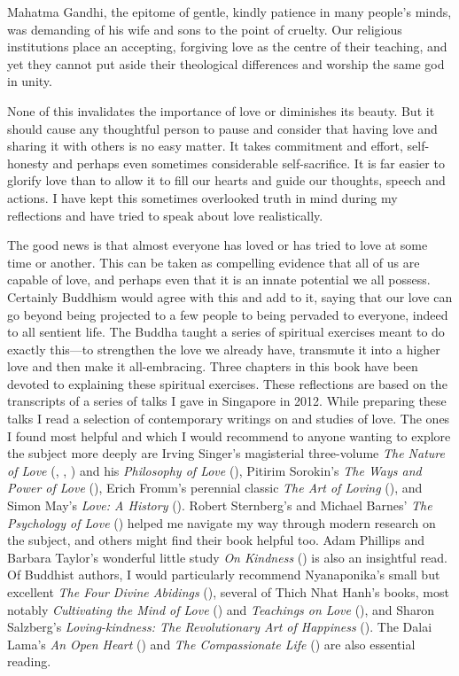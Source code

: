 \documentclass[10pt, openright]{book}
\begin{document}
Mahatma Gandhi, the epitome of gentle, kindly patience in many people’s minds, was demanding of his wife and sons to the point of cruelty. Our religious institutions place an accepting, forgiving love as the centre of their teaching, and yet they cannot put aside their theological differences and worship the same god in unity.


None of this invalidates the importance of love or diminishes its beauty. But it should cause any thoughtful person to pause and consider that having love and sharing it with others is no easy matter. It takes commitment and effort, self-honesty and perhaps even sometimes considerable self-sacrifice. It is far easier to glorify love than to allow it to fill our hearts and guide our thoughts, speech and actions. I have kept this sometimes overlooked truth in mind during my reflections and have tried to speak about love realistically.


The good news is that almost everyone has loved or has tried to love at some time or another. This can be taken as compelling evidence that all of us are capable of love, and perhaps even that it is an innate potential we all possess. Certainly Buddhism would agree with this and add to it, saying that our love can go beyond being projected to a few people to being pervaded to everyone, indeed to all sentient life. The Buddha taught a series of spiritual exercises meant to do exactly this—to strengthen the love we already have, transmute it into a higher love and then make it all-embracing. Three chapters in this book have been devoted to explaining these spiritual exercises. These reflections are based on the transcripts of a series of talks I gave in Singapore in 2012. While preparing these talks I read a selection of contemporary writings on and studies of love. The ones I found most helpful and which I would recommend to anyone wanting to explore the subject more deeply are Irving Singer’s magisterial three-volume \textit{The Nature of Love} (\cite{Singer 2009a}, \cite{Singer 2009b}, \cite{Singer 2009c}) and his \textit{Philosophy of Love} (\cite{Singer 2009d}), Pitirim Sorokin’s \textit{The Ways and Power of Love} (\cite{Sorokin 1954}), Erich Fromm’s perennial classic \textit{The Art of Loving} (\cite{Fromm 1956}), and Simon May’s \textit{Love: A History} (\cite{May 2012}). Robert Sternberg’s and Michael Barnes’ \textit{The Psychology of Love} (\cite{Sternberg and Barnes 1988}) helped me navigate my way through modern research on the subject, and others might find their book helpful too. Adam Phillips and Barbara Taylor’s wonderful little study \textit{On Kindness} (\cite{Phillips and Taylor 2009}) is also an insightful read. Of Buddhist authors, I would particularly recommend Nyanaponika’s small but excellent \textit{The Four Divine Abidings} (\cite{Nyanaponika 1958}), several of Thich Nhat Hanh’s books, most notably \textit{Cultivating the Mind of Love} (\cite{Hanh 1996}) and \textit{Teachings on Love} (\cite{Hanh 1998}), and Sharon Salzberg’s \textit{Loving-kindness: The Revolutionary Art of Happiness} (\cite{Salzberg 1995}). The Dalai Lama’s \textit{An Open Heart} (\cite{Dalai Lama 2001a}) and \textit{The Compassionate Life} (\cite{Dalai Lama 2001b}) are also essential reading.
\end{document}
